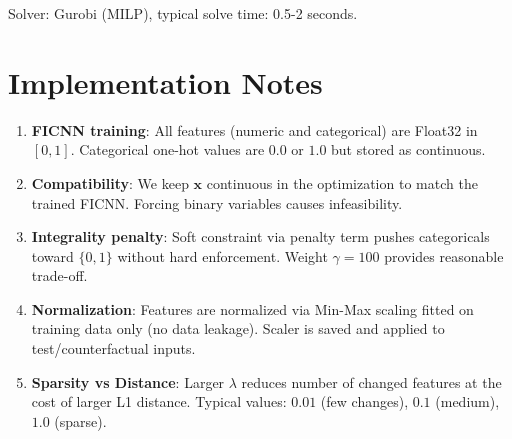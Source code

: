 \documentclass{article}
\begin{document}
Solver: Gurobi (MILP), typical solve time: 0.5-2 seconds.

\section{Implementation Notes}

\begin{enumerate}
    \item \textbf{FICNN training}: All features (numeric and categorical) are Float32 in $[0,1]$. Categorical one-hot values are $0.0$ or $1.0$ but stored as continuous.

    \item \textbf{Compatibility}: We keep $\mathbf{x}$ continuous in the optimization to match the trained FICNN. Forcing binary variables causes infeasibility.

    \item \textbf{Integrality penalty}: Soft constraint via penalty term pushes categoricals toward $\{0, 1\}$ without hard enforcement. Weight $\gamma = 100$ provides reasonable trade-off.

    \item \textbf{Normalization}: Features are normalized via Min-Max scaling fitted on training data only (no data leakage). Scaler is saved and applied to test/counterfactual inputs.

    \item \textbf{Sparsity vs Distance}: Larger $\lambda$ reduces number of changed features at the cost of larger L1 distance. Typical values: $0.01$ (few changes), $0.1$ (medium), $1.0$ (sparse).
\end{enumerate}
\end{document}
